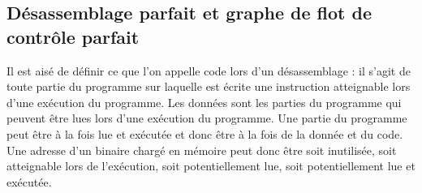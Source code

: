 


\subsection{Désassemblage parfait et graphe de flot de contrôle parfait}
Il est aisé de définir ce que l'on appelle code lors d'un désassemblage : il s'agit de toute partie du programme sur laquelle est écrite une instruction atteignable lors d'une exécution du programme.
Les données sont les parties du programme qui peuvent être lues lors d'une exécution du programme. 
Une partie du programme peut être à la fois lue et exécutée et donc être à la fois de la donnée et du code.
Une adresse d'un binaire chargé en mémoire peut donc être soit inutilisée, soit atteignable lors de l'exécution, soit potentiellement lue, soit potentiellement lue et exécutée.

\begin{center}
\end{center}

